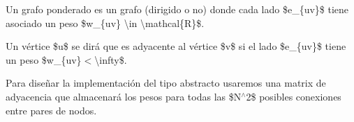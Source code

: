 Un grafo ponderado es un grafo (dirigido o no) donde cada lado \$e\+\_\+\{uv\}\$ tiene asociado un peso \$w\+\_\+\{uv\} \textbackslash{}in \textbackslash{}mathcal\{R\}\$.

Un vértice \$u\$ se dirá que es adyacente al vértice \$v\$ si el lado \$e\+\_\+\{uv\}\$ tiene un peso \$w\+\_\+\{uv\}$<$\textbackslash{}infty\$.

Para diseñar la implementación del tipo abstracto usaremos una matrix de adyacencia que almacenará los pesos para todas las \$N$^\wedge$2\$ posibles conexiones entre pares de nodos. 